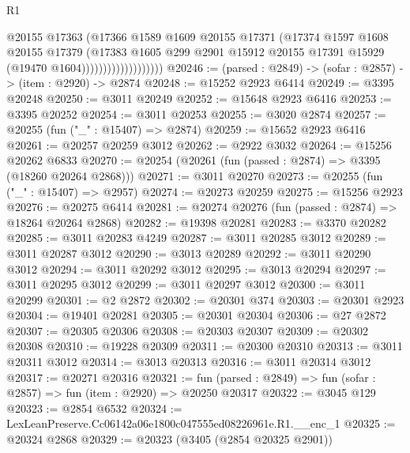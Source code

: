 \begin{lexlean}{R1}
\begin{coremodule}
                                  @20155
                                  @17363
                                  (@17366
                                    @1589
                                    @1609
                                    @20155
                                    @17371
                                    (@17374
                                      @1597
                                      @1608
                                      @20155
                                      @17379
                                      (@17383
                                        @1605
                                        @299
                                        @2901
                                        @15912
                                        @20155
                                        @17391
                                        @15929
                                        (@19470 @1604)))))))))))))))))))
@20246 := (parsed : @2849) -> (sofar : @2857) -> (item : @2920) -> @2874
@20248 := @15252 @2923 @6414
@20249 := @3395 @20248
@20250 := @3011 @20249
@20252 := @15648 @2923 @6416
@20253 := @3395 @20252
@20254 := @3011 @20253
@20255 := @3020 @2874
@20257 := @20255 (fun ("_" : @15407) => @2874)
@20259 := @15652 @2923 @6416
@20261 := @20257 @20259 @3012
@20262 := @2922 @3032
@20264 := @15256 @20262 @6833
@20270 := @20254 (@20261 (fun (passed : @2874) => @3395 (@18260 @20264 @2868)))
@20271 := @3011 @20270
@20273 := @20255 (fun ("_" : @15407) => @2957)
@20274 := @20273 @20259
@20275 := @15256 @2923
@20276 := @20275 @6414
@20281 := @20274 @20276 (fun (passed : @2874) => @18264 @20264 @2868)
@20282 := @19398 @20281
@20283 := @3370 @20282
@20285 := @3011 @20283 @4249
@20287 := @3011 @20285 @3012
@20289 := @3011 @20287 @3012
@20290 := @3013 @20289
@20292 := @3011 @20290 @3012
@20294 := @3011 @20292 @3012
@20295 := @3013 @20294
@20297 := @3011 @20295 @3012
@20299 := @3011 @20297 @3012
@20300 := @3011 @20299
@20301 := @2 @2872
@20302 := @20301 @374
@20303 := @20301 @2923
@20304 := @19401 @20281
@20305 := @20301 @20304
@20306 := @27 @2872
@20307 := @20305 @20306
@20308 := @20303 @20307
@20309 := @20302 @20308
@20310 := @19228 @20309
@20311 := @20300 @20310
@20313 := @3011 @20311 @3012
@20314 := @3013 @20313
@20316 := @3011 @20314 @3012
@20317 := @20271 @20316
@20321 := fun (parsed : @2849) => fun (sofar : @2857) => fun (item : @2920) => @20250 @20317
@20322 := @3045 @129
@20323 := @2854 @6532
@20324 := LexLeanPreserve.Cc06142a06e1800c047555ed08226961e.R1.__enc_1
@20325 := @20324 @2868
@20329 := @20323 (@3405 (@2854 @20325 @2901))

\end{coremodule}
\end{lexlean}
